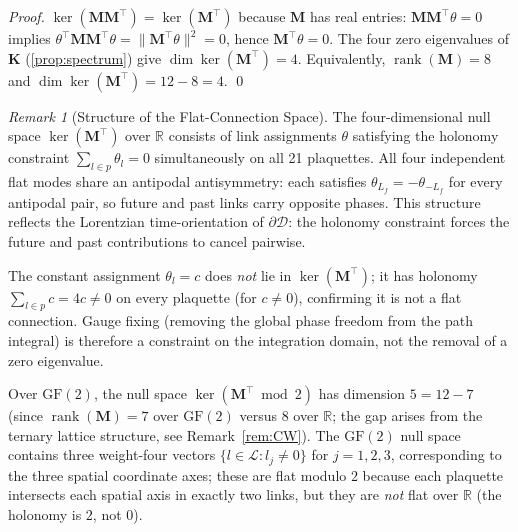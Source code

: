 \documentclass[12pt, a4paper]{article}
\theoremstyle{plain}
\theoremstyle{definition}
\theoremstyle{remark}
\newtheorem{remark}[theorem]{Remark}
\newcommand{\BdyCD}{\partial\mathscr{D}}
\newcommand{\LL}{\mathcal{L}}
\newcommand{\Kmat}{\mathbf{K}}
\newcommand{\Mmat}{\mathbf{M}}
\newcommand{\R}{\mathbb{R}}
\newcommand{\rank}{\operatorname{rank}}
\begin{document}
\begin{proof}
$\ker(\Mmat\Mmat^\top) = \ker(\Mmat^\top)$ because $\Mmat$ has
real entries: $\Mmat\Mmat^\top\theta = 0$ implies
$\theta^\top\Mmat\Mmat^\top\theta = \|\Mmat^\top\theta\|^2 = 0$,
hence $\Mmat^\top\theta = 0$.
The four zero eigenvalues of $\Kmat$
(\cref{prop:spectrum}) give $\dim\ker(\Mmat^\top) = 4$.
Equivalently, $\rank(\Mmat) = 8$ and $\dim\ker(\Mmat^\top)
= 12 - 8 = 4$.
\qed
\end{proof}
 
\begin{remark}[Structure of the Flat-Connection
Space]\label{rem:flat_structure}
The four-dimensional null space $\ker(\Mmat^\top)$ over $\R$
consists of link assignments $\theta$ satisfying the holonomy
constraint $\sum_{l\in p}\theta_l = 0$ simultaneously on all
21 plaquettes.
All four independent flat modes share an antipodal antisymmetry:
each satisfies $\theta_{L_f} = -\theta_{-L_f}$ for every
antipodal pair, so future and past links carry opposite phases.
This structure reflects the Lorentzian time-orientation of
$\BdyCD$: the holonomy constraint forces the future and past
contributions to cancel pairwise.

The constant assignment $\theta_l = c$ does \emph{not} lie in
$\ker(\Mmat^\top)$; it has holonomy $\sum_{l\in p} c = 4c \neq 0$
on every plaquette (for $c\neq0$), confirming it is not a flat
connection.
Gauge fixing (removing the global phase freedom from the path
integral) is therefore a constraint on the integration domain,
not the removal of a zero eigenvalue.

Over $\mathrm{GF}(2)$, the null space $\ker(\Mmat^\top\bmod 2)$
has dimension $5 = 12 - 7$ (since
$\rank(\Mmat)=7$ over $\mathrm{GF}(2)$ versus $8$ over $\R$;
the gap arises from the ternary lattice structure, see
Remark~\ref{rem:CW}).
The $\mathrm{GF}(2)$ null space contains three weight-four vectors
$\{l\in\LL : l_j\neq0\}$ for $j=1,2,3$, corresponding to the
three spatial coordinate axes; these are flat modulo $2$ because
each plaquette intersects each spatial axis in exactly two links,
but they are \emph{not} flat over $\R$ (the holonomy is $2$,
not $0$).
\end{remark}
 
\end{document}
